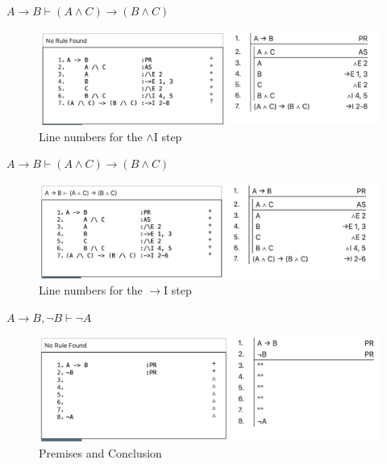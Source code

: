\documentclass[
  ignorenonframetext,
]{beamer}
\renewcommand{\,}{\text{, }}
\begin{document}
\begin{frame}{\(A \rightarrow B \vdash (A \wedge C) \rightarrow (B \wedge C)\)}
\protect\hypertarget{a-rightarrow-b-vdash-a-wedge-c-rightarrow-b-wedge-c-5}{}
\begin{figure}
\centering
\includegraphics[width=\textwidth,height=0.75\textheight]{5_4l.png}
\caption{Line numbers for the \(\wedge\)I step}
\end{figure}
\end{frame}

\begin{frame}{\(A \rightarrow B \vdash (A \wedge C) \rightarrow (B \wedge C)\)}
\protect\hypertarget{a-rightarrow-b-vdash-a-wedge-c-rightarrow-b-wedge-c-6}{}
\begin{figure}
\centering
\includegraphics[width=\textwidth,height=0.75\textheight]{5_4m.png}
\caption{Line numbers for the \(\rightarrow\)I step}
\end{figure}
\end{frame}

\begin{frame}{\(A \rightarrow B, \neg B \vdash \neg A\)}
\protect\hypertarget{a-rightarrow-b-neg-b-vdash-neg-a}{}
\begin{figure}
\centering
\includegraphics[width=\textwidth,height=0.75\textheight]{5_4n.png}
\caption{Premises and Conclusion}
\end{figure}
\end{frame}
\end{document}

